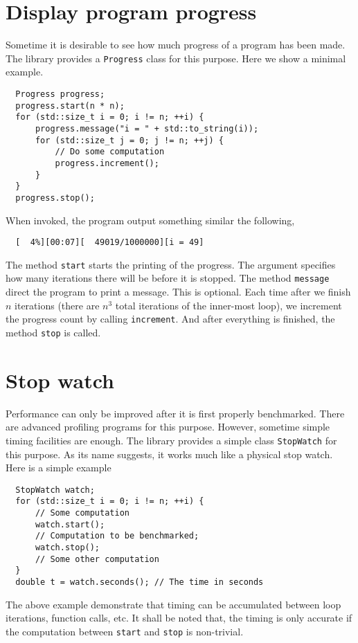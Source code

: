 \section{Display program progress}
\label{sec:Display program progress}

Sometime it is desirable to see how much progress of a program has been made.
The library provides a \verb|Progress| class for this purpose. Here we show a
minimal example.
\begin{Verbatim}
  Progress progress;
  progress.start(n * n);
  for (std::size_t i = 0; i != n; ++i) {
      progress.message("i = " + std::to_string(i));
      for (std::size_t j = 0; j != n; ++j) {
          // Do some computation
          progress.increment();
      }
  }
  progress.stop();
\end{Verbatim}
When invoked, the program output something similar the following,
\begin{Verbatim}
  [  4%][00:07][  49019/1000000][i = 49]
\end{Verbatim}
The method \verb|start| starts the printing of the progress. The argument
specifies how many iterations there will be before it is stopped. The method
\verb|message| direct the program to print a message. This is optional. Each
time after we finish $n$ iterations (there are $n^3$ total iterations of the
inner-most loop), we increment the progress count by calling \verb|increment|.
And after everything is finished, the method \verb|stop| is called.

\section{Stop watch}
\label{sec:Stop watch}

Performance can only be improved after it is first properly benchmarked. There
are advanced profiling programs for this purpose. However, sometime simple
timing facilities are enough. The library provides a simple class
\verb|StopWatch| for this purpose. As its name suggests, it works much like a
physical stop watch. Here is a simple example
\begin{Verbatim}
  StopWatch watch;
  for (std::size_t i = 0; i != n; ++i) {
      // Some computation
      watch.start();
      // Computation to be benchmarked;
      watch.stop();
      // Some other computation
  }
  double t = watch.seconds(); // The time in seconds
\end{Verbatim}
The above example demonstrate that timing can be accumulated between loop
iterations, function calls, etc. It shall be noted that, the timing is only
accurate if the computation between \verb|start| and \verb|stop| is
non-trivial.
